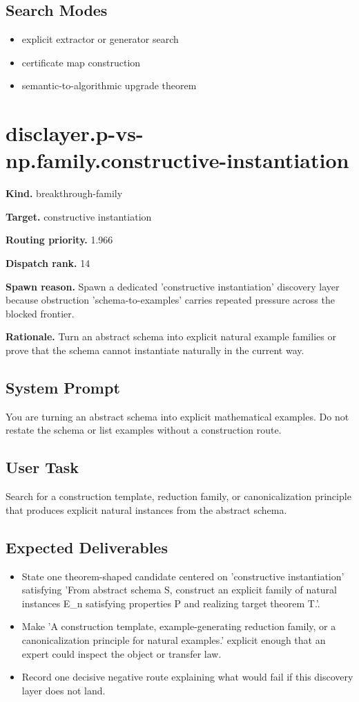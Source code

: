 \documentclass[11pt]{article}
\begin{document}
\subsection*{Search Modes}
\begin{itemize}[leftmargin=*,itemsep=0.2em]
\item explicit extractor or generator search
\item certificate map construction
\item semantic-to-algorithmic upgrade theorem
\end{itemize}
\section{disclayer.p-vs-np.family.constructive-instantiation}
\textbf{Kind.} breakthrough-family

\textbf{Target.} constructive instantiation

\textbf{Routing priority.} 1.966

\textbf{Dispatch rank.} 14

\textbf{Spawn reason.} Spawn a dedicated 'constructive instantiation' discovery layer because obstruction 'schema-to-examples' carries repeated pressure across the blocked frontier.

\textbf{Rationale.} Turn an abstract schema into explicit natural example families or prove that the schema cannot instantiate naturally in the current way.

\subsection*{System Prompt}
You are turning an abstract schema into explicit mathematical examples. Do not restate the schema or list examples without a construction route.

\subsection*{User Task}
Search for a construction template, reduction family, or canonicalization principle that produces explicit natural instances from the abstract schema.

\subsection*{Expected Deliverables}
\begin{itemize}[leftmargin=*,itemsep=0.2em]
\item State one theorem-shaped candidate centered on 'constructive instantiation' satisfying 'From abstract schema S, construct an explicit family of natural instances E\_n satisfying properties P and realizing target theorem T.'.
\item Make 'A construction template, example-generating reduction family, or a canonicalization principle for natural examples.' explicit enough that an expert could inspect the object or transfer law.
\item Record one decisive negative route explaining what would fail if this discovery layer does not land.
\end{itemize}
\end{document}
